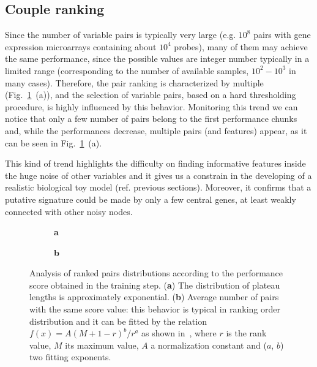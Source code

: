 \documentclass{standalone}
\begin{document}
\subsection[Ranking]{Couple ranking}\label{synapse:ranking}

Since the number of variable pairs is typically very large (e.g. $10^8$ pairs with gene expression microarrays containing about $10^4$ probes), many of them may achieve the same performance, since the possible values are integer number typically in a limited range (corresponding to the number of available samples, $10^2-10^3$ in many cases).
Therefore, the pair ranking is characterized by multiple  (Fig.~\ref{fig:plateaus}~(a)), and the selection of variable pairs, based on a hard thresholding procedure, is highly influenced by this behavior.
Monitoring this trend we can notice that only a few number of pairs belong to the first performance chunks and, while the performances decrease, multiple pairs (and features) appear, as it can be seen in Fig.~\ref{fig:plateaus}~(a).

This kind of trend highlights the difficulty on finding informative features inside the huge noise of other variables and it gives us a constrain in the developing of a realistic biological toy model (ref. previous sections).
Moreover, it confirms that a putative signature could be made by only a few central genes, at least weakly connected with other noisy nodes.

\begin{figure}[htbp]
\centering
\begin{subfigure}[t]{0.03\textwidth}
  \textbf{a}
\end{subfigure}
\begin{subfigure}[t]{0.45\textwidth}
  \def\svgwidth{\linewidth}
  \def\svgvalign{t}
  
\end{subfigure}\hfill
\begin{subfigure}[t]{0.03\textwidth}
  \textbf{b}
\end{subfigure}
\begin{subfigure}[t]{0.45\textwidth}
  \def\svgwidth{\linewidth}
  \def\svgvalign{t}
  
\end{subfigure}
\caption{Analysis of ranked pairs distributions according to the performance score obtained in the training step.
(\textbf{a}) The distribution of plateau lengths is approximately exponential.
(\textbf{b}) Average number of pairs with the same score value: this behavior is typical in ranking order distribution and it can be fitted by the relation $f(x) = A(M + 1 - r)^b / r^a$ as shown in~\cite{rankfit}, where $r$ is the rank value, $M$ its maximum value, $A$ a normalization constant and ($a$, $b$) two fitting exponents.}
\label{fig:plateaus}
\end{figure}
\end{document}
